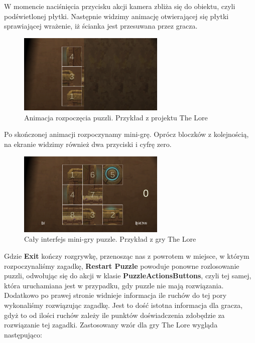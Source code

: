 \documentclass[oneside,polski,logo]{amuthesis}
\begin{document}
W momencie naciśnięcia przycisku akcji kamera zbliża się do obiektu, czyli podświetlonej płytki. Następnie widzimy animację otwierającej się płytki sprawiającej wrażenie, iż ścianka jest przesuwana przez gracza.
\begin{figure}[h]
	\centering
	\includegraphics[width=7cm]{images/tyrek/otwieraniePuzzli.png}
	\caption{Animacja rozpoczęcia puzzli. Przykład z projektu The Lore}
\end{figure}

Po skończonej animacji rozpoczynamy mini-grę. Oprócz bloczków z kolejnością, na ekranie widzimy również dwa przyciski i cyfrę zero.
\begin{figure}[h]
	\centering
	\includegraphics[width=7cm]{images/tyrek/puzzlebuttons.png}
	\caption{Cały interfejs mini-gry puzzle. Przykład z gry The Lore}
\end{figure}

Gdzie \textbf{Exit} kończy rozgrywkę, przenosząc nas z powrotem w miejsce, w którym rozpoczynaliśmy zagadkę, \textbf{Restart Puzzle} powoduje ponowne rozlosowanie puzzli, odwołując się do akcji w klasie \textbf{PuzzleActionsButtons}, czyli tej samej, która uruchamiana jest w przypadku, gdy puzzle nie mają rozwiązania. Dodatkowo po prawej stronie widnieje informacja ile ruchów do tej pory wykonaliśmy rozwiązując zagadkę. Jest to dość istotna informacja dla gracza, gdyż to od ilości ruchów zależy ile punktów doświadczenia zdobędzie za rozwiązanie tej zagadki. Zastosowany wzór dla gry The Lore wygląda następująco:
\end{document}
